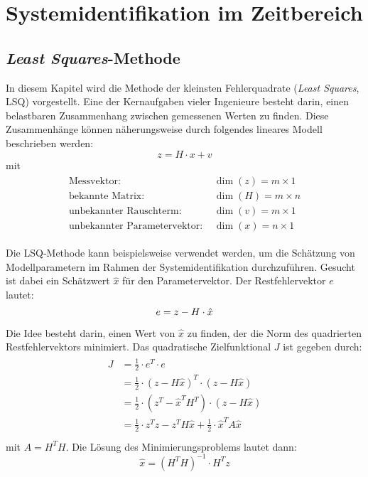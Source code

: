 \chapter{Systemidentifikation im Zeitbereich}

\section{\textit{Least Squares}-Methode}
In diesem Kapitel wird die Methode der kleinsten Fehlerquadrate (\textit{Least Squares}, LSQ) vorgestellt.
Eine der Kernaufgaben vieler Ingenieure besteht darin, einen belastbaren Zusammenhang zwischen gemessenen Werten zu finden. 
Diese Zusammenhänge können näherungsweise durch folgendes lineares Modell beschrieben werden:  
\begin{equation}
    z = H\cdot x+v 
\end{equation}
mit 
\begin{align}
	\begin{split}
		\text{Messvektor: } &\dim{(z)} = m\times 1\\
		\text{bekannte Matrix: } &\dim{(H)} = m\times n\\
		\text{unbekannter Rauschterm: } &\dim{(v)} = m\times1\\
		\text{unbekannter Parametervektor: } &\dim{(x)} = n\times 1
		\nonumber
	\end{split}
\end{align}

Die LSQ-Methode kann beispielsweise verwendet werden, um die Schätzung von Modellparametern im Rahmen der 
Systemidentifikation durchzuführen. Gesucht ist dabei ein Schätzwert $\hat{x}$ für den Parametervektor. Der Restfehlervektor 
$e$ lautet:
\begin{equation}
    e = z - H\cdot \hat{x} \\
\end{equation}

Die Idee besteht darin, einen Wert von $\hat{x}$ zu finden, der die Norm des quadrierten Restfehlervektors minimiert. Das 
quadratische Zielfunktional $J$ ist gegeben durch: 
\begin{align}
   \begin{split}
     J &= \frac{1}{2} \cdot e^{T} \cdot e \\
     &= \frac{1}{2} \cdot {(z- H\hat{x})}^{T}\cdot(z- H\hat{x}) \\
     &= \frac{1}{2} \cdot (z^{T} -{\hat{x}}^{T}H^{T})\cdot(z- H\hat{x}) \\
     &= \frac{1}{2} \cdot z^{T}z - z^{T}H\hat{x} + \frac{1}{2}\cdot {\hat{x}}^{T}A\hat{x}  \\
   \end{split}
\end{align}
mit $A = H^{T}H$. Die Lösung des Minimierungsproblems lautet dann:
\begin{equation}
    \hat{x}= {(H^{T} H)}^{-1} \cdot H^{T} z 
\end{equation}


